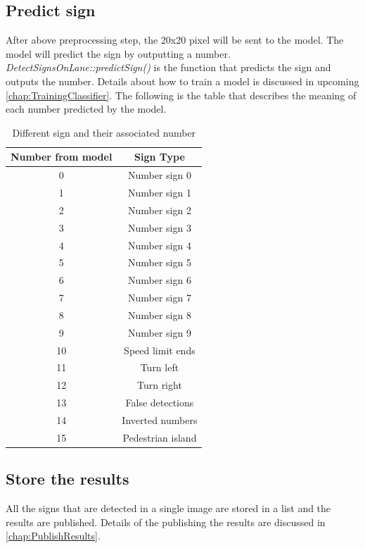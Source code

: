 \subsection{Predict sign}
\label{sec:PredictSign}
After above preprocessing step, the 20x20 pixel will be sent to the model. The model will predict the sign by outputting a number. \emph{DetectSignsOnLane::predictSign()} is the function that predicts the sign and outputs the number. Details about how to train a model is discussed in upcoming \autoref{chap:TrainingClassifier}. The following is the table that describes the meaning of each number predicted by the model.
\begin{table}[h!]
\centering
\begin{tabular}{|c|c|}
\hline
    Number from model & Sign Type\\
    \hline
    0 & Number sign 0\\
    1 & Number sign 1\\
    2 & Number sign 2\\
    3 & Number sign 3\\
    4 & Number sign 4\\
    5 & Number sign 5\\
    6 & Number sign 6\\
    7 & Number sign 7\\
    8 & Number sign 8\\
    9 & Number sign 9\\
    10 & Speed limit ends\\
    11 & Turn left\\
    12 & Turn right\\
    13 & False detections\\
    14 & Inverted numbers\\
    15 & Pedestrian island\\
\hline
\end{tabular}
\caption{Different sign and their associated number}
\label{table:NumberFromModel}
\end{table}

\subsection{Store the results}
\label{sec:SingleContStoreResults}
All the signs that are detected in a single image are stored in a list and the results are published. Details of the publishing the results are discussed in \autoref{chap:PublishResults}.